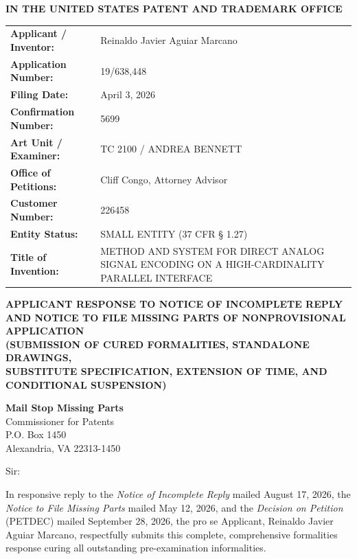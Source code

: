 \documentclass[11pt,letterpaper]{article}
\begin{document}
\thispagestyle{empty}

\begin{center}
    \textbf{\large IN THE UNITED STATES PATENT AND TRADEMARK OFFICE}
\end{center}

\vspace{0.3cm}
\noindent\begin{tabular}{p{2.3in}p{4.0in}}
\textbf{Applicant / Inventor:} & Reinaldo Javier Aguiar Marcano \\
\textbf{Application Number:} & 19/638,448 \\
\textbf{Filing Date:} & April 3, 2026 \\
\textbf{Confirmation Number:} & 5699 \\
\textbf{Art Unit / Examiner:} & TC 2100 / ANDREA BENNETT \\
\textbf{Office of Petitions:} & Cliff Congo, Attorney Advisor \\
\textbf{Customer Number:} & 226458 \\
\textbf{Entity Status:} & SMALL ENTITY (37 CFR \S{} 1.27) \\
\textbf{Title of Invention:} & METHOD AND SYSTEM FOR DIRECT ANALOG SIGNAL ENCODING ON A HIGH-CARDINALITY PARALLEL INTERFACE \\
\end{tabular}

\vspace{0.4cm}
\begin{center}
    \textbf{\large APPLICANT RESPONSE TO NOTICE OF INCOMPLETE REPLY \\
    AND NOTICE TO FILE MISSING PARTS OF NONPROVISIONAL APPLICATION} \\
    \textbf{\normalsize (SUBMISSION OF CURED FORMALITIES, STANDALONE DRAWINGS, \\
    SUBSTITUTE SPECIFICATION, EXTENSION OF TIME, AND CONDITIONAL SUSPENSION)}
\end{center}

\noindent\textbf{Mail Stop Missing Parts} \\
Commissioner for Patents \\
P.O. Box 1450 \\
Alexandria, VA 22313-1450

\vspace{0.2cm}
Sir:

In responsive reply to the \textit{Notice of Incomplete Reply} mailed August 17, 2026, the \textit{Notice to File Missing Parts} mailed May 12, 2026, and the \textit{Decision on Petition} (PETDEC) mailed September 28, 2026, the pro se Applicant, Reinaldo Javier Aguiar Marcano, respectfully submits this complete, comprehensive formalities response curing all outstanding pre-examination informalities.
\end{document}
